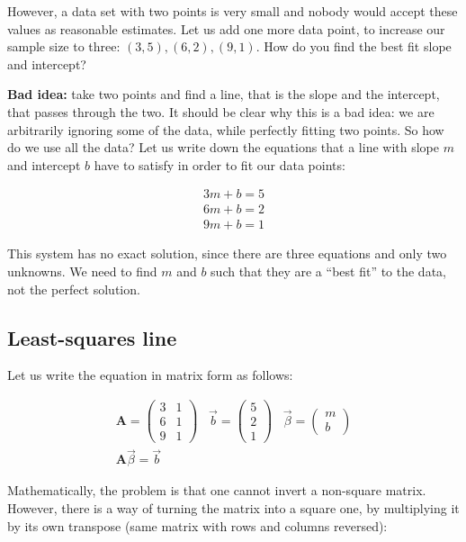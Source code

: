 \documentclass[
  letterpaper,
  DIV=11,
  numbers=noendperiod]{scrreprt}
\begin{document}
However, a data set with two points is very small and nobody would
accept these values as reasonable estimates. Let us add one more data
point, to increase our sample size to three: \((3,5), (6, 2), (9, 1)\).
How do you find the best fit slope and intercept?

\textbf{Bad idea:} take two points and find a line, that is the slope
and the intercept, that passes through the two. It should be clear why
this is a bad idea: we are arbitrarily ignoring some of the data, while
perfectly fitting two points. So how do we use all the data? Let us
write down the equations that a line with slope \(m\) and intercept
\(b\) have to satisfy in order to fit our data points:

\[
\begin{aligned}
3m + b = 5 \\
6m + b = 2\\
9m + b = 1
\end{aligned}
\]

This system has no exact solution, since there are three equations and
only two unknowns. We need to find \(m\) and \(b\) such that they are a
``best fit'' to the data, not the perfect solution.

\hypertarget{least-squares-line}{%
\subsection{Least-squares line}\label{least-squares-line}}

Let us write the equation in matrix form as follows:

\[
\begin{aligned}
\mathbf{A} = \begin{pmatrix} 3 & 1 \\ 6 & 1 \\ 9 & 1 \end{pmatrix} \;\;\; \vec{b} = \begin{pmatrix}5 \\ 2 \\ 1 \end{pmatrix} \;\;\;
\vec{\beta} = \begin{pmatrix} m \\ b \end{pmatrix} \\
\mathbf{A} \vec \beta = \vec b 
\end{aligned}
\]

Mathematically, the problem is that one cannot invert a non-square
matrix. However, there is a way of turning the matrix into a square one,
by multiplying it by its own transpose (same matrix with rows and
columns reversed):
\end{document}
